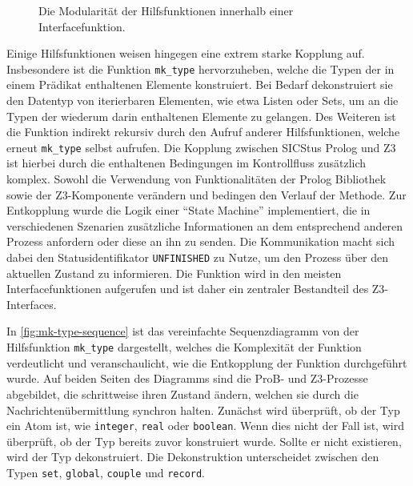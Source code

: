 \begin{figure}[!htp]
\begin{tikzpicture}[scale=1, every node/.style={scale=1}]

    \end{tikzpicture}
    \caption{Die Modularität der Hilfsfunktionen innerhalb einer Interfacefunktion.}
    \label{fig:help_modular}
\end{figure}

Einige Hilfsfunktionen weisen hingegen eine extrem starke Kopplung auf.
Insbesondere ist die Funktion \texttt{mk\_type} hervorzuheben, welche die Typen der in einem Prädikat enthaltenen Elemente konstruiert.
Bei Bedarf dekonstruiert sie den Datentyp von iterierbaren Elementen, wie etwa Listen oder Sets, um an die Typen der wiederum darin enthaltenen Elemente zu gelangen.
Des Weiteren ist die Funktion indirekt rekursiv durch den Aufruf anderer Hilfsfunktionen, welche erneut \texttt{mk\_type} selbst aufrufen.
Die Kopplung zwischen SICStus Prolog und Z3 ist hierbei durch die enthaltenen Bedingungen im Kontrollfluss zusätzlich komplex.
Sowohl die Verwendung von Funktionalitäten der Prolog Bibliothek sowie der Z3-Komponente verändern und bedingen den Verlauf der Methode.
Zur Entkopplung wurde die Logik einer \enquote{State Machine} implementiert, die in verschiedenen Szenarien zusätzliche Informationen
an dem entsprechend anderen Prozess anfordern oder diese an ihn zu senden.
Die Kommunikation macht sich dabei den Statusidentifikator \texttt{UNFINISHED} zu Nutze, um den Prozess über den aktuellen Zustand zu informieren.
Die Funktion wird in den meisten Interfacefunktionen aufgerufen und ist daher ein zentraler Bestandteil des Z3-Interfaces.

In \cref{fig:mk-type-sequence} ist das vereinfachte Sequenzdiagramm von der Hilfsfunktion \texttt{mk\_type} dargestellt, welches die Komplexität der Funktion verdeutlicht
und veranschaulicht, wie die Entkopplung der Funktion durchgeführt wurde.
Auf beiden Seiten des Diagramms sind die ProB- und Z3-Prozesse abgebildet, die schrittweise ihren Zustand ändern, welchen sie durch die Nachrichtenübermittlung synchron halten.
Zunächst wird überprüft, ob der Typ ein Atom ist, wie \texttt{integer}, \texttt{real} oder \texttt{boolean}.
Wenn dies nicht der Fall ist, wird überprüft, ob der Typ bereits zuvor konstruiert wurde.
Sollte er nicht existieren, wird der Typ dekonstruiert. Die Dekonstruktion unterscheidet zwischen den Typen \texttt{set}, \texttt{global}, \texttt{couple} und \texttt{record}.

